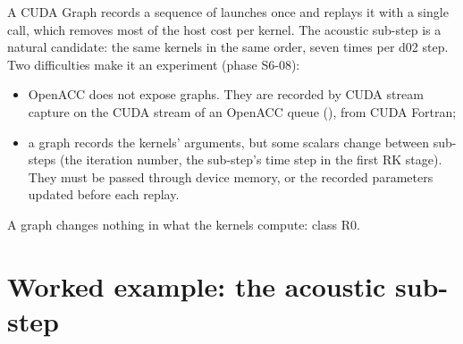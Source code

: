 A CUDA Graph records a sequence of launches once and replays it with a single call, which removes most of the host
cost per kernel. The acoustic sub-step is a natural candidate: the same kernels in the same order, seven times per
d02 step. Two difficulties make it an experiment (phase S6-08):
\begin{itemize}
  \item OpenACC does not expose graphs. They are recorded by CUDA stream capture on the CUDA stream of an OpenACC
    queue (), from CUDA Fortran;
  \item a graph records the kernels' arguments, but some scalars change between sub-steps (the iteration number, the
    sub-step's time step in the first RK stage). They must be passed through device memory, or the recorded parameters
    updated before each replay.
\end{itemize}
A graph changes nothing in what the kernels compute: class R0.

\section{Worked example: the acoustic sub-step}

